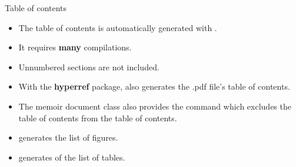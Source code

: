 \begin{frame}[fragile,c]{Table of contents}
	
	\begin{itemize}
		\item The table of contents is automatically generated with .
		\item It requires \textbf{many} compilations.
		\item Unnumbered sections are not included.
		\item With the \textbf{hyperref} package,  also generates the .pdf file's table
		of contents.
		\pause
		\item The memoir document class also provides the  command
			which excludes the table of contents from the table of contents.
		\pause
		\item {} generates the list of figures.
		\item {} generates of the list of tables.
	\end{itemize}

\end{frame}

